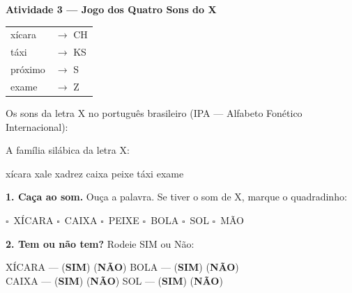 \begin{consolidacao}
\textbf{Atividade 3 --- Jogo dos Quatro Sons do X}


\begin{center}
\begin{tabular}{ll}
x\'icara & $\rightarrow$ CH \\
t\'axi & $\rightarrow$ KS \\
pr\'oximo & $\rightarrow$ S \\
exame & $\rightarrow$ Z
\end{tabular}
\end{center}

\end{consolidacao}


\begin{sonsdaletra}
Os sons da letra X no portugu\^es{} brasileiro (IPA --- Alfabeto Fon\'etico Internacional):

\end{sonsdaletra}


\begin{familiasilabica}
A fam\'ilia sil\'abica da letra X:

\begin{center}
x\'icara \quad xale \quad xadrez \quad caixa \quad peixe \quad t\'axi \quad exame
\end{center}
\end{familiasilabica}


\begin{somletra}
\textbf{1. Ca\c{c}a ao som.} Ou\c{c}a a palavra. Se tiver o som de X, marque o quadradinho:
\begin{center}
$\square$~X\'ICARA \quad $\square$~CAIXA \quad $\square$~PEIXE \quad $\square$~BOLA \quad $\square$~SOL \quad $\square$~M\~AO
\end{center}

\textbf{2. Tem ou n\~ao{} tem?} Rodeie SIM ou N\~ao:
\begin{center}
X\'ICARA --- (\textbf{SIM}) (\textbf{N\~AO}) \quad BOLA --- (\textbf{SIM}) (\textbf{N\~AO}) \\ CAIXA --- (\textbf{SIM}) (\textbf{N\~AO}) \quad SOL --- (\textbf{SIM}) (\textbf{N\~AO})
\end{center}
\end{somletra}


